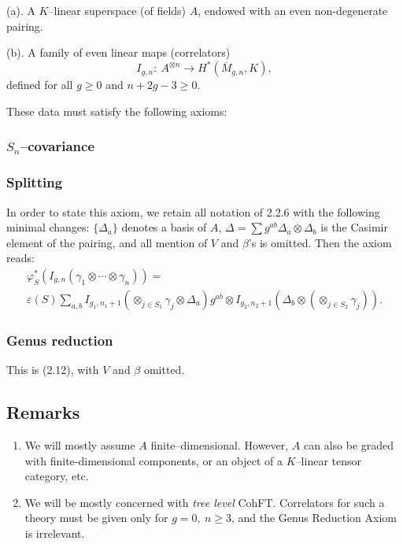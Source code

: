 \documentclass[reqno]{amsart}
\theoremstyle{definition}
\begin{document}
\smallskip

(a). A $K$--linear superspace (of fields) $A$, endowed with an
even non-degenerate pairing.

\smallskip

(b). A family of even linear maps (correlators)
\[
  I_{g,n}:\ A^{\otimes n}\to H^*({\overline{M}}_{g,n},K),
\]
defined for all $g\ge 0$ and $n+2g-3\ge 0$.

\smallskip

These data must satisfy the following axioms:

\smallskip

\subsubsection{$S_n$--covariance}

\smallskip

\subsubsection{Splitting}
In order to state this axiom, we retain all
notation of 2.2.6 with the following minimal changes: $\{ \Delta_a\}$
denotes a basis of $A$, $\Delta =\sum g^{ab}\Delta_a\otimes\Delta_b$
is the Casimir element of the pairing, and all mention of $V$ and
$\beta$'s is omitted. Then the axiom reads:
\begin{equation}
  \begin{multlined}
    \varphi^*_S(I_{g,n}(\gamma_1\otimes\cdots\otimes\gamma_n))=
    \\
    \varepsilon (S)\sum_{a,b}
    I_{g_1,n_1+1}(\otimes_{j\in S_1}\gamma_j\otimes\Delta_a)g^{ab}\otimes
    I_{g_2,n_2+1}(\Delta_b\otimes (\otimes_{j\in S_2}\gamma_j)).
  \end{multlined}
  \tag{6.1}
\end{equation}

\smallskip

\subsubsection{Genus reduction}
This is (2.12), with $V$ and $\beta$
omitted.

\medskip

\subsection{Remarks}
\begin{enumerate}
  \item[(a)] We will mostly assume $A$ finite--dimensional.
    However, $A$ can also be graded with finite-dimensional components,
    or an object of a $K$--linear tensor category, etc.
  \item[(b)] We will be mostly concerned with \textit{tree level} CohFT.
    Correlators for such a theory must be given only for $g=0,\ n\ge 3$,
    and the Genus Reduction Axiom is irrelevant.
\end{enumerate}
\end{document}
